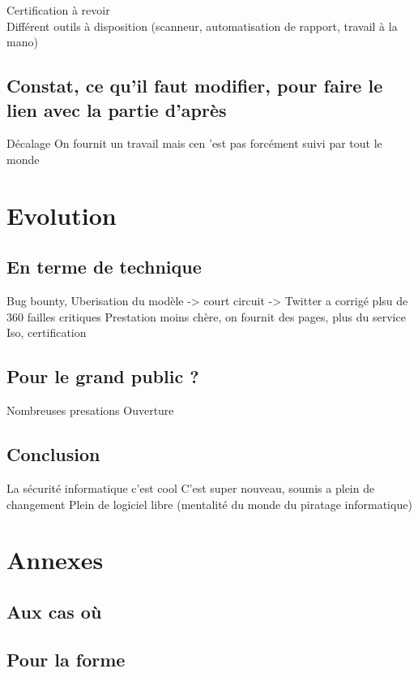 \documentclass[a4paper]{memoir}
\begin{document}
Certification à revoir\\

  
Différent outils à disposition
(scanneur, automatisation de rapport, travail à la mano)

\chapter{Constat, ce qu'il faut modifier, pour faire le lien avec la partie d'après}

Décalage
On fournit un travail mais cen 'est pas forcément suivi par tout le monde 

\part{Evolution}

\chapter{En terme de technique}

Bug bounty, Uberisation du modèle -> court circuit -> Twitter a corrigé plsu de 360 failles critiques 
Prestation moins chère, on fournit des pages, plus du service
Iso, certification

\chapter{Pour le grand public ?}

Nombreuses presations
Ouverture



\chapter*{Conclusion}

La sécurité informatique c'est cool
C'est super nouveau, soumis a plein de changement
Plein de logiciel libre (mentalité du monde du piratage informatique)


\part*{Annexes}
\appendix

\chapter{Aux cas où}

\chapter{Pour la forme}


\backmatter%

\nocite{*}



\printindex
\end{document}
